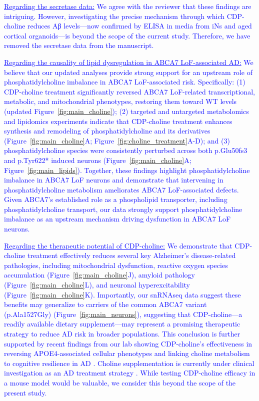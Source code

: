 \textcolor{blue}{\underline{Regarding the secretase data:} We agree with the reviewer that these findings are intriguing. However, investigating the precise mechanism through which CDP-choline reduces Aβ levels—now confirmed by ELISA in media from iNs and aged cortical organoids—is beyond the scope of the current study. Therefore, we have removed the secretase data from the manuscript.}

\textcolor{blue}{\underline{Regarding the causality of lipid dysregulation in ABCA7 LoF-associated AD:} We believe that our updated analyses provide strong support for an upstream role of phosphatidylcholine imbalance in ABCA7 LoF-associated risk. Specifically: (1) CDP-choline treatment significantly reversed ABCA7 LoF-related transcriptional, metabolic, and mitochondrial phenotypes, restoring them toward WT levels (updated Figure~\ref{fig:main_choline}); (2) targeted and untargeted metabolomics and lipidomics experiments indicate that CDP-choline treatment enhances synthesis and remodeling of phosphatidylcholine and its derivatives (Figure~\ref{fig:main_choline}A; Figure~\ref{fig:choline_treatment}A-D); and (3) phosphatidylcholine species were consistently perturbed across both p.Glu50fs3 and p.Tyr622* induced neurons (Figure~\ref{fig:main_choline}A; Figure~\ref{fig:main_lipids}). Together, these findings highlight phosphatidylcholine imbalance in ABCA7 LoF neurons and demonstrate that intervening in phosphatidylcholine metabolism ameliorates ABCA7 LoF-associated defects. Given ABCA7’s established role as a phospholipid transporter, including phosphatidylcholine transport, our data strongly support phosphatidylcholine imbalance as an upstream mechanism driving dysfunction in ABCA7 LoF neurons.}

\textcolor{blue}{\underline{Regarding the therapeutic potential of CDP-choline:} We demonstrate that CDP-choline treatment effectively reduces several key Alzheimer’s disease-related pathologies, including mitochondrial dysfunction, reactive oxygen species accumulation (Figure~\ref{fig:main_choline}J), amyloid pathology (Figure~\ref{fig:main_choline}L), and neuronal hyperexcitability (Figure~\ref{fig:main_choline}K). Importantly, our snRNAseq data suggest these benefits may generalize to carriers of the common ABCA7 variant (p.Ala1527Gly) (Figure~\ref{fig:main_neurons}), suggesting that CDP-choline—a readily available dietary supplement—may represent a promising therapeutic strategy to reduce AD risk in broader populations. This conclusion is further supported by recent findings from our lab showing CDP-choline’s effectiveness in reversing APOE4-associated cellular phenotypes \cite{Sienski2021-zt} and linking choline metabolism to cognitive resilience in AD \cite{Mathys2024-ex}. Choline supplementation is currently under clinical investigation as an AD treatment strategy \cite{Cummings2024-cu}. While testing CDP-choline efficacy in a mouse model would be valuable, we consider this beyond the scope of the present study.}

